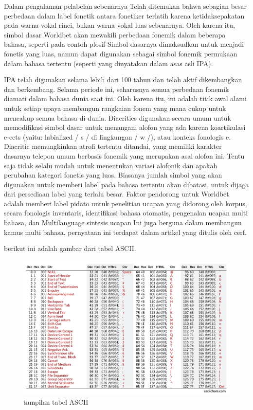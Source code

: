 \begin{itemize}
 	Dalam pengalaman pelabelan sebenarnya Telah ditemukan bahwa sebagian besar perbedaan dalam label fonetik antara fonetiker terlatih karena ketidaksepakatan pada warna vokal rinci, bukan warna vokal luas sebenarnya. Oleh karena itu, simbol dasar Worldbet akan mewakili perbedaan fonemik dalam beberapa bahasa, seperti pada contoh plosif Simbol dasarnya dimaksudkan untuk menjadi fonetis yang luas, namun dapat digunakan sebagai simbol fonemik permukaan dalam bahasa tertentu (seperti yang dinyatakan dalam asas asli IPA).
 
 	IPA telah digunakan selama lebih dari 100 tahun dan telah aktif dikembangkan dan berkembang. Selama periode ini, seharusnya semua perbedaan fonemik diamati dalam bahasa dunia saat ini. Oleh karena itu, ini adalah titik awal alami untuk setiap upaya membangun rangkaian fonem yang mana cukup untuk mencakup semua bahasa di dunia.
 	Diacritics digunakan secara umum untuk memodifikasi simbol dasar untuk menangani alofon yang ada karena koartikulasi e-ects (yaitu: labialized / s / di lingkungan / w /), atau konteks fonologis e. Diacritic memungkinkan atrofi tertentu ditandai, yang memiliki karakter dasarnya telepon umum berbasis fonemik yang merupakan asal alofon ini. Tentu saja tidak selalu mudah untuk menentukan variasi alofonik dan apakah perubahan kategori fonetis yang luas. Biasanya jumlah simbol yang akan digunakan untuk memberi label pada bahasa tertentu akan dibatasi, untuk dijaga dari persediaan label yang terlalu besar. Faktor pendorong untuk Worldbet adalah memberi label pidato untuk penelitian ucapan yang didorong oleh korpus, secara fonologis inventaris, identifikasi bahasa otomatis, pengenalan ucapan multi bahasa, dan Multilanguage sintesis ucapan Ini juga berguna dalam membangun kamus multi bahasa. pernyataan ini terdapat dalam artikel yang ditulis oleh cerf. \cite{cerf1969ascii}

 	berikut ini adalah gambar dari tabel ASCII.
 	\begin{figure}[ht]
\centerline{\includegraphics[width=1\textwidth]{figures/ASCII.JPG}}
\caption{tampilan tabel ASCII}
\label{ASCII}
\end{figure}


\end{itemize}
